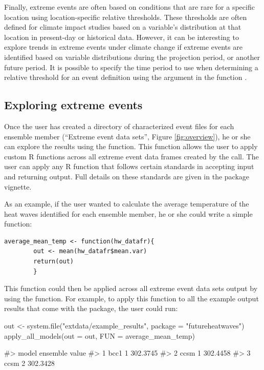 Finally, extreme events are often based on conditions that are rare for
a specific location using location-specific relative thresholds. These
thresholds are often defined for climate impact studies based on a
variable's distribution at that location in present-day or historical
data. However, it can be interesting to explore trends in extreme events
under climate change if extreme events are identified based on variable
distributions during the projection period, or another future period. It
is possible to specify the time period to use when determining a
relative threshold for an event definition using the
 argument in the function .

\subsection{Exploring extreme events}\label{exploring-extreme-events}

Once the user has created a directory of characterized event files for
each ensemble member (``Extreme event data sets'', Figure
\ref{fig:overview}), he or she can explore the results using the
 function. This function allows the user to
apply custom R functions across all extreme event data frames created by
the  call. The user can apply any R function that
follows certain standards in accepting input and returning output. Full
details on these standards are given in the 
package vignette.

As an example, if the user wanted to calculate the average temperature
of the heat waves identified for each ensemble member, he or she could
write a simple function:

\begin{verbatim}
average_mean_temp <- function(hw_datafr){
        out <- mean(hw_datafr$mean.var)
        return(out)
        }
\end{verbatim}

\noindent This function could then be applied across all extreme event
data sets output by  using the
 function. For example, to apply this function
to all the example output results that come with the package, the user
could run:

\begin{Schunk}
\begin{Sinput}
out <- system.file("extdata/example_results", package = "futureheatwaves")
apply_all_models(out = out, FUN = average_mean_temp)
\end{Sinput}
\begin{Soutput}
#>   model ensemble    value
#> 1  bcc1        1 302.3745
#> 2  ccsm        1 302.4458
#> 3  ccsm        2 302.3428
\end{Soutput}
\end{Schunk}


